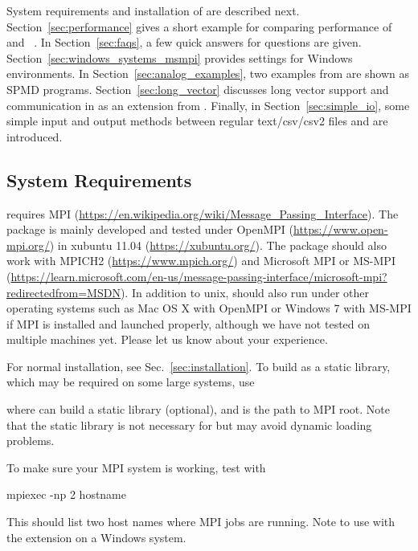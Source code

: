 System requirements and installation of  are described
next.  Section~\ref{sec:performance} gives a short example for
comparing performance of  and ~\citep{Yu2002}.
In Section~\ref{sec:faqs}, a few quick answers for questions are
given.  Section~\ref{sec:windows_systems_msmpi} provides settings for
Windows environments.  In Section~\ref{sec:analog_examples},
two examples from  are shown as SPMD 
programs. Section~\ref{sec:long_vector} discusses long vector support
and communication in  as an extension from .
Finally, in Section~\ref{sec:simple_io}, some simple input and output
methods between regular text/csv/csv2 files and  are
introduced.


\subsection[System Requirements]{System Requirements}
\label{sec:system_requirements}

 requires MPI
(\url{https://en.wikipedia.org/wiki/Message_Passing_Interface}). The
package is mainly developed and tested under {\color{blue} OpenMPI}
(\url{https://www.open-mpi.org/}) in xubuntu 11.04
(\url{https://xubuntu.org/}). The package should also work with
MPICH2 (\url{https://www.mpich.org/}) and
Microsoft MPI or MS-MPI
(\url{https://learn.microsoft.com/en-us/message-passing-interface/microsoft-mpi?redirectedfrom=MSDN}).
In addition to unix,  should also run under other operating systems
such as Mac OS X with OpenMPI or Windows 7 with MS-MPI if MPI is
installed and launched properly, although we have not tested on
multiple machines yet.  Please let us know about your experience.

For normal installation, see Sec.~\ref{sec:installation}. To build as
a static library, which may be required on some large systems, use
where {\color{red} \code{-}} can build a static
library (optional), and  is the path to MPI root.
Note that the static library is not necessary for  but may
avoid dynamic loading problems.

To make sure your MPI system is working, test with
\begin{Command}
mpiexec -np 2 hostname
\end{Command}
This should list two host names where MPI jobs are running.  Note to
use  with the extension on a Windows system.


